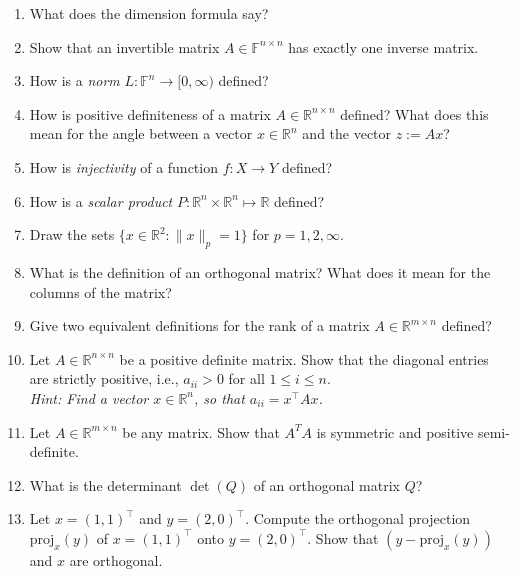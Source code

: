 \begin{enumerate}
	 \item What does the dimension formula say?
	 \item  Show that an invertible matrix $A\in\mathbb{F}^{n \times n}$ has exactly one inverse matrix.
	 \item How is a \textit{norm} $L: \mathbb{F}^n \to [0, \infty)$ defined?
	 \item How is positive definiteness of a matrix $A\in \mathbb{R}^{n \times n}$ defined? What does this mean for the angle
	 between a vector $x \in \mathbb{R}^{n}$ and the vector $z := Ax$?
	 \item How is \textit{injectivity} of a function $f\colon X \to Y$ defined?
	 	\item How is a \textit{scalar product} $P\colon \mathbb{R}^n \times \mathbb{R}^n \mapsto \mathbb{R}$ defined?
\item Draw the sets $\{x \in \mathbb{R}^{2} \colon \|x\|_p = 1   \}$ for $p=1,2,\infty$.
\item What is the definition of an orthogonal matrix? What does it mean for the columns of the matrix?
\item Give two equivalent definitions for the rank of a matrix $A \in \mathbb{R}^{m \times n}$ defined?
\item  Let $A \in \mathbb{R}^{n \times n}$ be a positive definite matrix. Show that the diagonal entries are strictly positive, i.e.,  $a_{ii} > 0$ for all $1\leq i\leq n$.\\
\textit{Hint: Find a vector $x\in\mathbb{R}^{n}$, so that $a_{ii}=x^\top A x$.}
\item Let $A \in  \mathbb{R}^{m \times n}$ be any matrix. Show that $A^TA$ is symmetric and positive semi-definite. 
\item What is the determinant $\det(Q)$ of an orthogonal matrix $Q$?
\item Let  $x=(1,1)^\top$ and $y=(2,0)^\top$. Compute the orthogonal projection $\text{proj}_x(y) $ of $x=(1,1)^\top$ onto $y=(2,0)^\top$. Show that $(y - \text{proj}_x(y))$ and $x$ are orthogonal.
\end{enumerate}
 